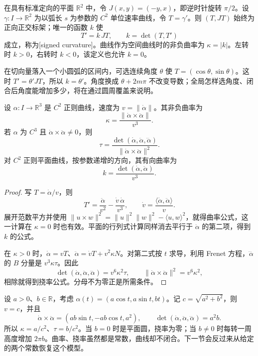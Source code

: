 \begin{definition}\label{g1:def:signed-plane-curvature}
	在具有标准定向的平面 \(\mathbb R^2\) 中，令 \(J(x,y)=(-y,x)\)，即逆时针旋转 \(\pi/2\)。设 \(\gamma:I\to\mathbb R^2\) 为以弧长 \(s\) 为参数的 \(C^2\) 单位速率曲线，令 \(T=\gamma'\)。则 \((T,JT)\) 始终为正向正交标架；唯一的函数 \(k\) 使
	\[
		T'=k\,JT,\qquad k=\det(T,T')
	\]
	成立，称为[signed curvature]。曲线作为空间曲线时的非负曲率为 \(\kappa=|k|\)。左转时 \(k>0\)，右转时 \(k<0\)，该定义也允许 \(k=0\)。
\end{definition}

在切向量落入一个小圆弧的区间内，可选连续角度 \(\theta\) 使 \(T=(\cos\theta,\sin\theta)\)。这时 \(T'=\theta'JT\)，所以 \(k=\theta'\)。角度换成 \(\theta+2m\pi\) 不改变导数；全局怎样选角度、闭合后角度能增加多少，将在通过圆周覆盖来说明。

\begin{proposition}\label{g1:prop:curvature-torsion-formulas}
	设 \(\alpha:I\to\mathbb R^3\) 是 \(C^2\) 正则曲线，速度为 \(v=\lVert\dot\alpha\rVert\)。其非负曲率为
	\[
		\kappa=\frac{\lVert\dot\alpha\times\ddot\alpha\rVert}{v^3}.
	\]
	若 \(\alpha\) 为 \(C^3\) 且 \(\dot\alpha\times\ddot\alpha\ne0\)，则
	\[
		\tau=\frac{\det(\dot\alpha,\ddot\alpha,\dddot\alpha)}
		{\lVert\dot\alpha\times\ddot\alpha\rVert^2}.
	\]
	对 \(C^2\) 正则平面曲线，按参数递增的方向，其有向曲率为
	\[
		k=\frac{\det(\dot\alpha,\ddot\alpha)}{v^3}.
	\]
\end{proposition}
\begin{proof}
	写 \(T=\dot\alpha/v\)，则
	\[
		T'=\frac{\ddot\alpha}{v^2}-\frac{\dot v\,\dot\alpha}{v^3},\qquad
		\dot v=\frac{\langle\dot\alpha,\ddot\alpha\rangle}{v}.
	\]
	展开范数平方并使用 \(\lVert u\times w\rVert^2=\lVert u\rVert^2\lVert w\rVert^2-\langle u,w\rangle^2\)，就得曲率公式，这一计算在 \(\kappa=0\) 时也有效。平面的行列式计算同样消去平行于 \(\dot\alpha\) 的第二项，得到 \(k\) 的公式。

	在 \(\kappa>0\) 时，\(\dot\alpha=vT\)、\(\ddot\alpha=\dot vT+v^2\kappa N\)。对第二式按 \(t\) 求导，利用 Frenet 方程，\(\dddot\alpha\) 的 \(B\) 分量是 \(v^3\kappa\tau\)。因此
	\[
		\det(\dot\alpha,\ddot\alpha,\dddot\alpha)=v^6\kappa^2\tau,\qquad
		\lVert\dot\alpha\times\ddot\alpha\rVert^2=v^6\kappa^2,
	\]
	相除就得到挠率公式。分母不为零正是所需条件。
\end{proof}

\begin{example}\label{g1:exm:circular-helix-invariants}
	设 \(a>0\)、\(b\in\mathbb R\)，考虑 \(\alpha(t)=(a\cos t,a\sin t,bt)\)。记 \(c=\sqrt{a^2+b^2}\)，则 \(v=c\)，并且
	\[
		\dot\alpha\times\ddot\alpha=(ab\sin t,-ab\cos t,a^2),\qquad
		\det(\dot\alpha,\ddot\alpha,\dddot\alpha)=a^2b.
	\]
	所以 \(\kappa=a/c^2\)、\(\tau=b/c^2\)。当 \(b=0\) 时是平面圆，挠率为零；当 \(b\ne0\) 时每转一周高度增加 \(2\pi b\)。曲率、挠率虽然都是常数，曲线却不闭合。下一节会反过来从给定的两个常数恢复这个模型。
\end{example}

